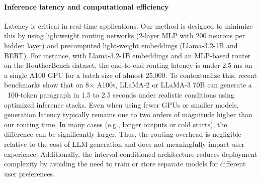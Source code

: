\documentclass{article}
\theoremstyle{remark}
\begin{document}
\paragraph{Inference latency and computational efficiency} Latency is critical in real-time applications. Our method is designed to minimize this by using lightweight routing networks (2-layer MLP with 200 neurons per hidden layer) and precomputed light-weight embeddings (Llama-3.2-1B and BERT). For instance, with Llama-3.2-1B embeddings and an MLP-based router on the RoutherBench dataset, the end-to-end routing latency is under 2.5 ms on a single A100 GPU for a batch size of almost 25,000. To contextualize this, recent benchmarks show that on 8× A100s, LLaMA‑2 or LLaMA‑3 70B can generate a ~100-token paragraph in 1.5 to 2.5 seconds under realistic conditions using optimized inference stacks. Even when using fewer GPUs or smaller models, generation latency typically remains one to two orders of magnitude higher than our routing time. In many cases (e.g., longer outputs or cold starts), the difference can be significantly larger. Thus, the routing overhead is negligible relative to the cost of LLM generation and does not meaningfully impact user experience. Additionally, the interval-conditioned architecture reduces deployment complexity by avoiding the need to train or store separate models for different user preferences.



\end{document}
